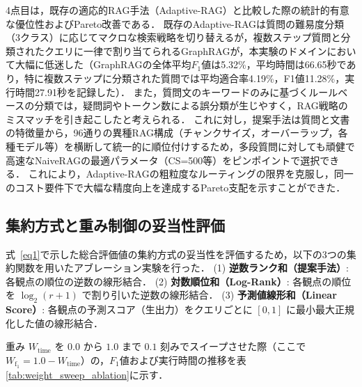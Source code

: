 4点目は，既存の適応的RAG手法（Adaptive-RAG）と比較した際の統計的有意な優位性およびPareto改善である．
既存のAdaptive-RAGは質問の難易度分類（3クラス）に応じてマクロな検索戦略を切り替えるが，複数ステップ質問と分類されたクエリに一律で割り当てられるGraphRAGが，本実験のドメインにおいて大幅に低迷した（GraphRAGの全体平均$F_1$値は5.32\%，平均時間は66.65秒であり，特に複数ステップに分類された質問では平均適合率4.19\%，F1値11.28\%，実行時間27.91秒を記録した）．
また，質問文のキーワードのみに基づくルールベースの分類では，疑問詞やトークン数による誤分類が生じやすく，RAG戦略のミスマッチを引き起こしたと考えられる．
これに対し，提案手法は質問と文書の特徴量から，96通りの異種RAG構成（チャンクサイズ，オーバーラップ，各種モデル等）を横断して統一的に順位付けするため，多段質問に対しても頑健で高速なNaiveRAGの最適パラメータ（CS=500等）をピンポイントで選択できる．
これにより，Adaptive-RAGの粗粒度なルーティングの限界を克服し，同一のコスト要件下で大幅な精度向上を達成するPareto支配を示すことができた．

\subsection{集約方式と重み制御の妥当性評価} \label{sec5.4.1}
式~\eqref{eq1}で示した総合評価値の集約方式の妥当性を評価するため，以下の3つの集約関数を用いたアブレーション実験を行った．
(1) \textbf{逆数ランク和（提案手法）}: 各観点の順位の逆数の線形結合．
(2) \textbf{対数順位和（Log-Rank）}: 各観点の順位を $\log_2(r+1)$ で割り引いた逆数の線形結合．
(3) \textbf{予測値線形和（Linear Score）}: 各観点の予測スコア（生出力）をクエリごとに $[0,1]$ に最小最大正規化した値の線形結合．

重み $W_{\mathrm{time}}$ を $0.0$ から $1.0$ まで $0.1$ 刻みでスイープさせた際（ここで $W_{\mathrm{f_1}} = 1.0 - W_{\mathrm{time}}$）の，$F_1$値および実行時間の推移を表\ref{tab:weight_sweep_ablation}に示す．

